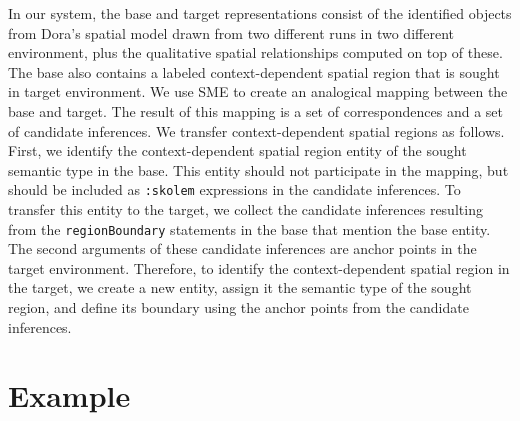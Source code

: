 \documentclass[letterpaper]{article}
\newcommand{\fw}[1]{\texttt{#1}}
\begin{document}

In our system, the base and target representations consist of the identified objects from Dora's spatial model drawn from two different runs in two different environment, plus the qualitative spatial relationships computed on top of these. The base also contains a labeled context-dependent spatial region that is sought in target environment. We use SME to create an analogical mapping between the base and target. The result of this mapping is a set of correspondences and a set of candidate inferences. We transfer context-dependent spatial regions as follows. First, we identify the context-dependent spatial region entity of the sought semantic type in the base. This entity should not participate in the mapping, but should be included as \fw{:skolem} expressions in the candidate inferences. To transfer this entity to the target, we collect the candidate inferences resulting from the \fw{regionBoundary} statements in the base that mention the base entity. The second arguments of these candidate inferences are anchor points in the target environment. Therefore, to identify the context-dependent spatial region in the target, we create a new entity, assign it the semantic type of the sought region, and define its boundary using the anchor points from the candidate inferences.

\section{Example}
\end{document}
